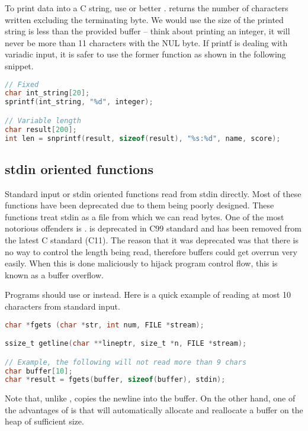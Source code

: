 To print data into a C string, use  or better .
 returns the number of characters written excluding the terminating byte.
We would use  the size of the printed string is less than the provided buffer -- think about printing an integer, it will never be more than 11 characters with the NUL byte.
If printf is dealing with variadic input, it is safer to use the former function as shown in the following snippet.

\begin{lstlisting}[language=C]
// Fixed
char int_string[20];
sprintf(int_string, "%d", integer);

// Variable length
char result[200];
int len = snprintf(result, sizeof(result), "%s:%d", name, score);
\end{lstlisting}

\subsection{stdin oriented functions}

Standard input or stdin oriented functions read from stdin directly.
Most of these functions have been deprecated due to them being poorly designed. These functions treat stdin as a file from which we can read bytes.
One of the most notorious offenders is .
 is deprecated in C99 standard and has been removed from the latest C standard (C11).
The reason that it was deprecated was that there is no way to control the length being read, therefore buffers could get overrun very easily.
When this is done maliciously to hijack program control flow, this is known as a buffer overflow.

Programs should use  or  instead.
Here is a quick example of reading at most 10 characters from standard input.

\begin{lstlisting}[language=C]
char *fgets (char *str, int num, FILE *stream);

ssize_t getline(char **lineptr, size_t *n, FILE *stream);

// Example, the following will not read more than 9 chars
char buffer[10];
char *result = fgets(buffer, sizeof(buffer), stdin);
\end{lstlisting}

Note that, unlike ,  copies the newline into the buffer.
On the other hand, one of the advantages of  is that will automatically allocate and reallocate a buffer on the heap of sufficient size.

